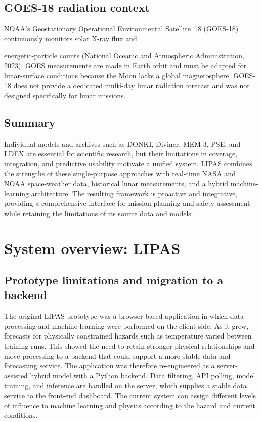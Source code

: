 \subsection{GOES-18 radiation context}

NOAA's Geostationary Operational Environmental Satellite~18 (GOES-18) continuously monitors solar X-ray flux and

energetic-particle counts (National Oceanic and Atmospheric Administration, 2023). GOES measurements are made in Earth orbit and must be adapted for lunar-surface conditions because the Moon lacks a global magnetosphere. GOES-18 does not provide a dedicated multi-day lunar radiation forecast and was not designed specifically for lunar missions.

\subsection{Summary}

Individual models and archives such as DONKI, Diviner, MEM 3, PSE, and LDEX are essential for scientific research, but their limitations in coverage, integration, and predictive usability motivate a unified system. LIPAS combines the strengths of these single-purpose approaches with real-time NASA and NOAA space-weather data, historical lunar measurements, and a hybrid machine-learning architecture. The resulting framework is proactive and integrative, providing a comprehensive interface for mission planning and safety assessment while retaining the limitations of its source data and models.

\section{System overview: LIPAS}

\subsection{Prototype limitations and migration to a backend}

The original LIPAS prototype was a browser-based application in which data processing and machine learning were performed on the client side. As it grew, forecasts for physically constrained hazards such as temperature varied between training runs. This showed the need to retain stronger physical relationships and move processing to a backend that could support a more stable data and forecasting service. The application was therefore re-engineered as a server-assisted hybrid model with a Python backend. Data filtering, API polling, model training, and inference are handled on the server, which supplies a stable data service to the front-end dashboard. The current system can assign different levels of influence to machine learning and physics according to the hazard and current conditions.

